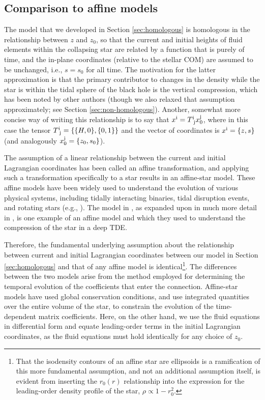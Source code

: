 \documentclass[twocolumn]{aastex62}
\begin{document}
\subsection{{Comparison to affine models}}
\label{sec:comps}
The model that we developed in Section \ref{sec:homologous} is homologous in the relationship between $z$ and $z_0$, so that the current and initial heights of fluid elements within the collapsing star are related by a function that is purely of time, and the in-plane coordinates (relative to the stellar COM) are assumed to be unchanged, i.e., $s = s_0$ for all time. The motivation for the latter approximation is that the primary contributor to changes in the density while the star is within the tidal sphere of the black hole is the vertical compression, which has been noted by other authors (though we also relaxed that assumption approximately; see Section \ref{sec:non-homologous}). Another, somewhat more concise way of writing this relationship is to say that $x^{\rm i} = T^{\rm i}_{\rm\,\,j}x_0^{\rm j}$, where in this case the tensor $T^{\rm i}_{\rm\,\, j} = \{\{H,0\},\{0,1\}\}$ and the vector of coordinates is $x^{\rm i} = \{z,s\}$ (and analogously $x_0^{\rm j} = \{z_0,s_0\}$).

The assumption of a linear relationship between the current and initial Lagrangian coordinates has been called an affine transformation, and applying such a transformation specifically to a star results in an affine-star model. These affine models have been widely used to understand the evolution of various physical systems, including tidally interacting binaries, tidal disruption events, and rotating stars (e.g., \citealt{lattimer76, carter83, carter85, kosovichev92, kochanek92, lai94, ivanov01}). The model in \citet{carter83}, as expanded upon in much more detail in \citet{carter85}, is one example of an affine model and which they used to understand the compression of the star in a deep TDE. 

Therefore, the fundamental underlying assumption about the relationship between current and initial Lagrangian coordinates between our model in Section \ref{sec:homologous} and that of any affine model is identical\footnote{{That the isodensity contours of an affine star are ellipsoids is a ramification of this more fundamental assumption, and not an additional assumption itself, is evident from inserting the $r_0(r)$ relationship into the expression for the leading-order density profile of the star, $\rho \propto 1-r_0^2$.}}. The differences between the two models arise from the method employed for determining the temporal evolution of the coefficients that enter the connection. Affine-star models have used global conservation conditions, and use integrated quantities over the entire volume of the star, to constrain the evolution of the time-dependent matrix coefficients. Here, on the other hand, we use the fluid equations in differential form and equate leading-order terms in the initial Lagrangian coordinates, as the fluid equations must hold identically for any choice of $z_0$.
\end{document}
